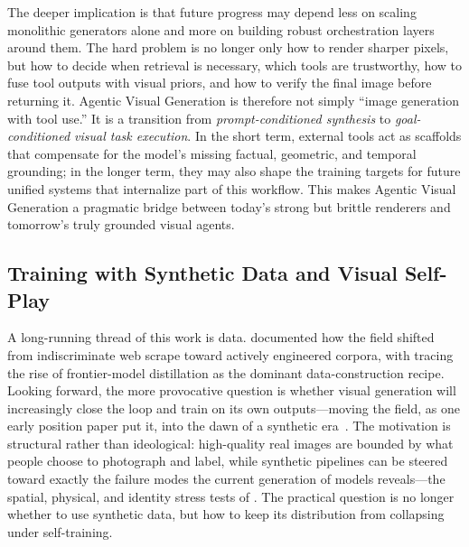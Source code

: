 The deeper implication is that future progress may depend less on scaling monolithic generators alone and more on building robust orchestration layers around them. The hard problem is no longer only how to render sharper pixels, but how to decide when retrieval is necessary, which tools are trustworthy, how to fuse tool outputs with visual priors, and how to verify the final image before returning it. Agentic Visual Generation is therefore not simply ``image generation with tool use.'' It is a transition from \emph{prompt-conditioned synthesis} to \emph{goal-conditioned visual task execution}. In the short term, external tools act as scaffolds that compensate for the model's missing factual, geometric, and temporal grounding; in the longer term, they may also shape the training targets for future unified systems that internalize part of this workflow. This makes Agentic Visual Generation a pragmatic bridge between today's strong but brittle renderers and tomorrow's truly grounded visual agents.

\subsection{Training with Synthetic Data and Visual Self-Play}
\label{subsec:synthetic_self_play}

A long-running thread of this work is data.  documented how the field shifted from indiscriminate web scrape toward actively engineered corpora, with  tracing the rise of frontier-model distillation as the dominant data-construction recipe. Looking forward, the more provocative question is whether visual generation will increasingly close the loop and train on its own outputs---moving the field, as one early position paper put it, into the dawn of a synthetic era~\citep{yang2023aigs}. The motivation is structural rather than ideological: high-quality real images are bounded by what people choose to photograph and label, while synthetic pipelines can be steered toward exactly the failure modes the current generation of models reveals---the spatial, physical, and identity stress tests of . The practical question is no longer whether to use synthetic data, but how to keep its distribution from collapsing under self-training.

